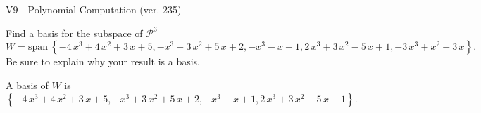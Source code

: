 \begin{exercise}
  \begin{exerciseTitle}V9 - Polynomial Computation (ver. 235)\end{exerciseTitle}
  \begin{exerciseStatement}
    Find a basis for the subspace of \(\mathcal{P}^3\) 
\[W=\mathrm{span}\ \left\{-4 \, x^{3} + 4 \, x^{2} + 3 \, x + 5 , -x^{3} + 3 \, x^{2} + 5 \, x + 2 , -x^{3} - x + 1 , 2 \, x^{3} + 3 \, x^{2} - 5 \, x + 1 , -3 \, x^{3} + x^{2} + 3 \, x\right\}.\]
 Be sure to explain why your result is a basis.


  \end{exerciseStatement}
  \begin{exerciseAnswer}
   A basis of \(W\) is  \(\left\{-4 \, x^{3} + 4 \, x^{2} + 3 \, x + 5 , -x^{3} + 3 \, x^{2} + 5 \, x + 2 , -x^{3} - x + 1 , 2 \, x^{3} + 3 \, x^{2} - 5 \, x + 1\right\}\).
  


  \end{exerciseAnswer}
\end{exercise}